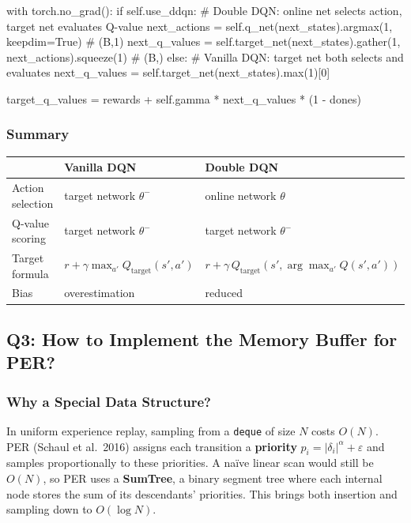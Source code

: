 \documentclass[12pt,a4paper]{report}
\begin{document}
\begin{pycode}
with torch.no_grad():
    if self.use_ddqn:
        # Double DQN: online net selects action, target net evaluates Q-value
        next_actions  = self.q_net(next_states).argmax(1, keepdim=True)      # (B,1)
        next_q_values = self.target_net(next_states).gather(1, next_actions).squeeze(1)  # (B,)
    else:
        # Vanilla DQN: target net both selects and evaluates
        next_q_values = self.target_net(next_states).max(1)[0]

    target_q_values = rewards + self.gamma * next_q_values * (1 - dones)
\end{pycode}

\subsubsection*{Summary}

\begin{center}
{\setlength{\tabcolsep}{14pt}
\begin{tabular}{lll}
\toprule
 & \textbf{Vanilla DQN} & \textbf{Double DQN} \\
\midrule
Action selection & target network $\theta^-$ & online network $\theta$ \\
Q-value scoring  & target network $\theta^-$ & target network $\theta^-$ \\
Target formula   & $r + \gamma\max_{a'} Q_{\text{target}}(s',a')$ & $r + \gamma\, Q_{\text{target}}(s', \arg\max_{a'}Q(s',a'))$ \\
Bias             & overestimation            & reduced \\
\bottomrule
\end{tabular}}
\end{center}

\newpage

\subsection*{Q3: How to Implement the Memory Buffer for PER?}

\subsubsection*{Why a Special Data Structure?}

In uniform experience replay, sampling from a \texttt{deque} of size $N$ costs $O(N)$.
PER (Schaul et al.\ 2016) assigns each transition a \textbf{priority}
$p_i = |\delta_i|^\alpha + \varepsilon$ and samples proportionally to these priorities.
A naïve linear scan would still be $O(N)$, so PER uses a \textbf{SumTree}, a binary
segment tree where each internal node stores the sum of its descendants' priorities.
This brings both insertion and sampling down to $O(\log N)$.
\end{document}
